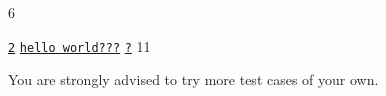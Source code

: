 
\resett

\nextt
\begin{console}[fontsize=\small,commandchars=\\\{\}]
6
\end{console}

\nextt
\begin{console}[commandchars=\\\{\}]
\underline{\texttt{2}}
\underline{\texttt{hello world???}}
\underline{\texttt{?}}
11
\end{console}

You are strongly advised to try more test cases of your own.

